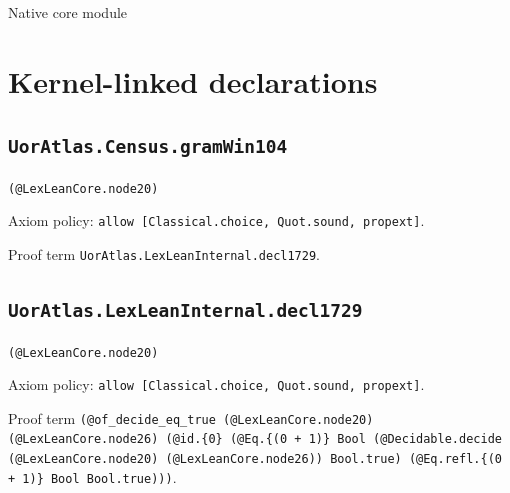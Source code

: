 \documentclass[11pt]{article}
\begin{document}
\begin{center}{\LARGE Native core module}\end{center}
\section*{Kernel-linked declarations}
\subsection*{\texttt{UorAtlas.Census.gramWin104}}
\noindent\texttt{(@LexLeanCore.node20)}\par
\noindent Axiom policy: \texttt{allow [Classical.choice, Quot.sound, propext]}.\par
\noindent Proof term \texttt{UorAtlas.LexLeanInternal.decl1729}.\par
\subsection*{\texttt{UorAtlas.LexLeanInternal.decl1729}}
\noindent\texttt{(@LexLeanCore.node20)}\par
\noindent Axiom policy: \texttt{allow [Classical.choice, Quot.sound, propext]}.\par
\noindent Proof term \texttt{(@of\_decide\_eq\_true (@LexLeanCore.node20) (@LexLeanCore.node26) (@id.\{0\} (@Eq.\{(0 + 1)\} Bool (@Decidable.decide (@LexLeanCore.node20) (@LexLeanCore.node26)) Bool.true) (@Eq.refl.\{(0 + 1)\} Bool Bool.true)))}.\par
\end{document}
